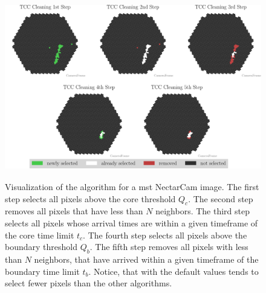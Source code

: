 \begin{figure}
    \centering
    \includegraphics[height=8cm]{plots/cleaner_steps/tcc.pdf}
    \caption{Visualization of the \tcc{} algorithm for a \gls{mst} NectarCam image. The first step
    selects all pixels above the core threshold \(Q_c\). The second step removes all pixels that have less than
    \(N\) neighbors. The third step selects all pixels whose arrival times are within a given timeframe of the
    core time limit \(t_c\). The fourth step selects all pixels above the boundary threshold \(Q_b\).
    The fifth step removes all pixels with less than \(N\) neighbors, that have arrived within a given timeframe
    of the boundary time limit \(t_b\). Notice, that with the default values \tcc{} tends to select fewer pixels
    than the other algorithms.}
    \label{fig:tcc_cleaning}
\end{figure}
\vspace{-0.5cm}

